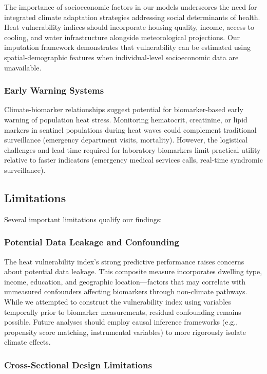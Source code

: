 The importance of socioeconomic factors in our models underscores the need for integrated climate adaptation strategies addressing social determinants of health. Heat vulnerability indices should incorporate housing quality, income, access to cooling, and water infrastructure alongside meteorological projections. Our imputation framework demonstrates that vulnerability can be estimated using spatial-demographic features when individual-level socioeconomic data are unavailable.

\subsubsection{Early Warning Systems}

Climate-biomarker relationships suggest potential for biomarker-based early warning of population heat stress. Monitoring hematocrit, creatinine, or lipid markers in sentinel populations during heat waves could complement traditional surveillance (emergency department visits, mortality). However, the logistical challenges and lead time required for laboratory biomarkers limit practical utility relative to faster indicators (emergency medical services calls, real-time syndromic surveillance).

\subsection{Limitations}

Several important limitations qualify our findings:

\subsubsection{Potential Data Leakage and Confounding}

The heat vulnerability index's strong predictive performance raises concerns about potential data leakage. This composite measure incorporates dwelling type, income, education, and geographic location---factors that may correlate with unmeasured confounders affecting biomarkers through non-climate pathways. While we attempted to construct the vulnerability index using variables temporally prior to biomarker measurements, residual confounding remains possible. Future analyses should employ causal inference frameworks (e.g., propensity score matching, instrumental variables) to more rigorously isolate climate effects.

\subsubsection{Cross-Sectional Design Limitations}

